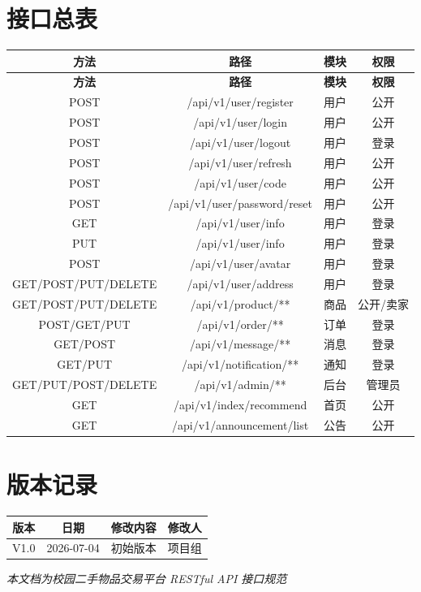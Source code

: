 \documentclass[12pt,a4paper,UTF8]{ctexart}
\begin{document}
\newpage
\appendix
\section{接口总表}

\begin{longtable}{|c|c|c|c|}
    \hline
    \textbf{方法} & \textbf{路径} & \textbf{模块} & \textbf{权限} \\
    \hline
    \endfirsthead
    \hline
    \textbf{方法} & \textbf{路径} & \textbf{模块} & \textbf{权限} \\
    \hline
    \endhead
    \hline
    \endfoot

    POST & /api/v1/user/register & 用户 & 公开 \\
    \hline
    POST & /api/v1/user/login & 用户 & 公开 \\
    \hline
    POST & /api/v1/user/logout & 用户 & 登录 \\
    \hline
    POST & /api/v1/user/refresh & 用户 & 公开 \\
    \hline
    POST & /api/v1/user/code & 用户 & 公开 \\
    \hline
    POST & /api/v1/user/password/reset & 用户 & 公开 \\
    \hline
    GET & /api/v1/user/info & 用户 & 登录 \\
    \hline
    PUT & /api/v1/user/info & 用户 & 登录 \\
    \hline
    POST & /api/v1/user/avatar & 用户 & 登录 \\
    \hline
    GET/POST/PUT/DELETE & /api/v1/user/address & 用户 & 登录 \\
    \hline
    GET/POST/PUT/DELETE & /api/v1/product/** & 商品 & 公开/卖家 \\
    \hline
    POST/GET/PUT & /api/v1/order/** & 订单 & 登录 \\
    \hline
    GET/POST & /api/v1/message/** & 消息 & 登录 \\
    \hline
    GET/PUT & /api/v1/notification/** & 通知 & 登录 \\
    \hline
    GET/PUT/POST/DELETE & /api/v1/admin/** & 后台 & 管理员 \\
    \hline
    GET & /api/v1/index/recommend & 首页 & 公开 \\
    \hline
    GET & /api/v1/announcement/list & 公告 & 公开 \\
    \hline
\end{longtable}

\section{版本记录}

\begin{longtable}{|c|c|c|c|}
    \hline
    \textbf{版本} & \textbf{日期} & \textbf{修改内容} & \textbf{修改人} \\
    \hline
    V1.0 & 2026-07-04 & 初始版本 & 项目组 \\
    \hline
\end{longtable}

\vfill
\begin{center}
    \textit{本文档为校园二手物品交易平台 RESTful API 接口规范}
\end{center}
\end{document}

